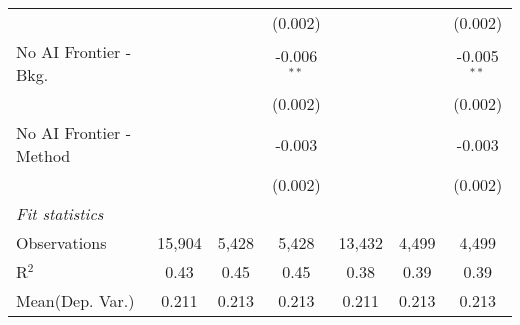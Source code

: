 \begin{tabular}{lcccccc}
                           &          &         & (0.002)       &         &              & (0.002)\\   
   No AI Frontier - Bkg.   &          &         & -0.006$^{**}$ &         &              & -0.005$^{**}$\\   
                           &          &         & (0.002)       &         &              & (0.002)\\   
   No AI Frontier - Method &          &         & -0.003        &         &              & -0.003\\   
                           &          &         & (0.002)       &         &              & (0.002)\\   
   \midrule
   \emph{Fit statistics}\\
   Observations            & 15,904   & 5,428   & 5,428         & 13,432  & 4,499        & 4,499\\  
   R$^2$                   & 0.43     & 0.45    & 0.45          & 0.38    & 0.39         & 0.39\\  
Mean(Dep. Var.) & 0.211 & 0.213 & 0.213 & 0.211 & 0.213 & 0.213 \\
   

\end{tabular}

